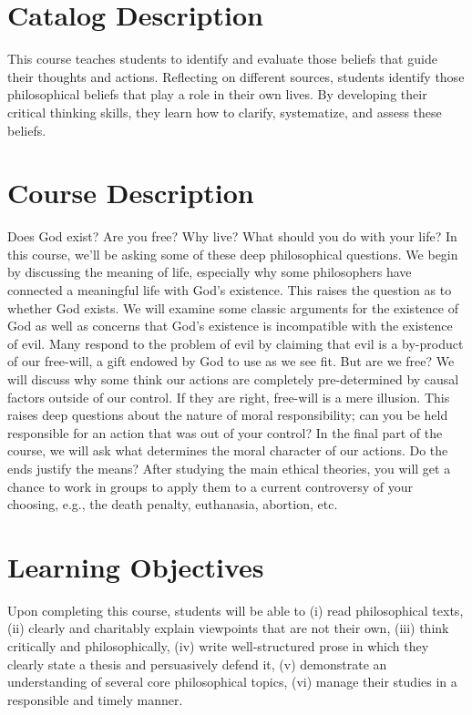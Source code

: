 \documentclass[article,oneside]{memoir}
\begin{document}
\section{Catalog Description}

This course teaches students to identify and evaluate those beliefs that guide their thoughts and actions. Reflecting on different sources, students identify those philosophical beliefs that play a role in their own lives. By developing their critical thinking skills, they learn how to clarify, systematize, and assess these beliefs. 

\section{Course Description}

Does God exist? Are you free? Why live? What should you do with your life?  In this course, we'll be asking some of these deep philosophical questions. We begin by discussing the meaning of life, especially why some philosophers have connected a meaningful life with God's existence. This raises the question as to whether God exists. We will examine some classic arguments for the existence of God as well as concerns that God's existence is incompatible with the existence of evil. Many respond to the problem of evil by claiming that evil is a by-product of our free-will, a gift endowed by God to use as we see fit. But are we free? We will discuss why some think our actions are completely pre-determined by causal factors outside of our control. If they are right, free-will is a mere illusion. This raises deep questions about the nature of moral responsibility; can you be held responsible for an action that was out of your control? In the final part of the course, we will ask what determines the moral character of our actions. Do the ends justify the means? After studying the main ethical theories, you will get a chance to work in groups to apply them to a current controversy of your choosing, e.g., the death penalty, euthanasia, abortion, etc. 

\section{Learning Objectives}

Upon completing this course, students will be able to (i) read
philosophical texts, (ii) clearly and charitably explain viewpoints that
are not their own, (iii) think critically and philosophically, (iv)
write well-structured prose in which they clearly state a thesis and
persuasively defend it, (v) demonstrate an understanding of several core
philosophical topics, (vi) manage their studies in a responsible and timely manner. 
\end{document}
